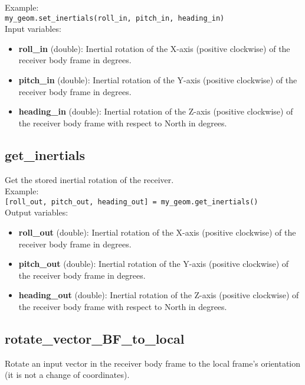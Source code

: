 Example:\\

\texttt{my\_geom.set\_inertials(roll\_in, pitch\_in, heading\_in)}\\

Input variables:
\begin{itemize}
\item {\bf roll\_in} (double): Inertial rotation of the X-axis (positive clockwise) of the receiver body frame in degrees.
\item {\bf pitch\_in} (double): Inertial rotation of the Y-axis (positive clockwise) of the receiver body frame in degrees.
\item {\bf heading\_in} (double): Inertial rotation of the Z-axis (positive clockwise) of the receiver body frame with respect to North in degrees.
\end{itemize}


\subsection{get\_inertials}

Get the stored inertial rotation of the receiver.\\

Example:\\

\texttt{[roll\_out, pitch\_out, heading\_out] = my\_geom.get\_inertials()}\\

Output variables:
\begin{itemize}
\item {\bf roll\_out} (double): Inertial rotation of the X-axis (positive clockwise) of the receiver body frame in degrees.
\item {\bf pitch\_out} (double): Inertial rotation of the Y-axis (positive clockwise) of the receiver body frame in degrees.
\item {\bf heading\_out} (double): Inertial rotation of the Z-axis (positive clockwise) of the receiver body frame with respect to North in degrees.
\end{itemize}


\subsection{rotate\_vector\_BF\_to\_local}

Rotate an input vector in the receiver body frame to the local frame's orientation (it is not a change of coordinates).\\

